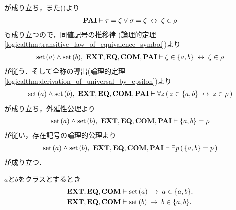 \begin{sketch}
\begin{description}
				が成り立ち，また()より
				\begin{align}
					\PAIAX \vdash \tau = \zeta \vee \sigma = \zeta \lrarrow \zeta \in \rho
				\end{align}
				も成り立つので，同値記号の推移律
				(論理的定理\ref{logicalthm:transitive_law_of_equivalence_symbol})より
				\begin{align}
					\set{a} \wedge \set{b},\ \EXTAX,\EQAX,\COMAX,\PAIAX \vdash 
					\zeta \in \{a,b\} \lrarrow \zeta \in \rho
				\end{align}
				が従う．そして全称の導出(論理的定理\ref{logicalthm:derivation_of_universal_by_epsilon})より
				\begin{align}
					\set{a} \wedge \set{b},\ \EXTAX,\EQAX,\COMAX,\PAIAX \vdash 
					\forall z\, (\, z \in \{a,b\} \lrarrow z \in \rho\, )
				\end{align}
				が成り立ち，外延性公理より
				\begin{align}
					\set{a} \wedge \set{b},\ \EXTAX,\EQAX,\COMAX,\PAIAX \vdash 
					\{a,b\} = \rho
				\end{align}
				が従い，存在記号の論理的公理より
				\begin{align}
					\set{a} \wedge \set{b},\ \EXTAX,\EQAX,\COMAX,\PAIAX \vdash 
					\exists p\, (\, \{a,b\} = p\, )
				\end{align}
				が成り立つ．
				\QED
		\end{description}
	\end{sketch}
	
	\begin{screen}
		\begin{thm}[集合は自分自身の対の要素である]
		\label{thm:set_is_an_element_of_its_pair}
			$a$と$b$をクラスとするとき
			\begin{align}
				\EXTAX,\EQAX,\COMAX &\vdash \set{a} \rarrow a \in \{a,b\}, \\
				\EXTAX,\EQAX,\COMAX &\vdash \set{b} \rarrow b \in \{a,b\}.
			\end{align}
		\end{thm}
	\end{screen}
	
